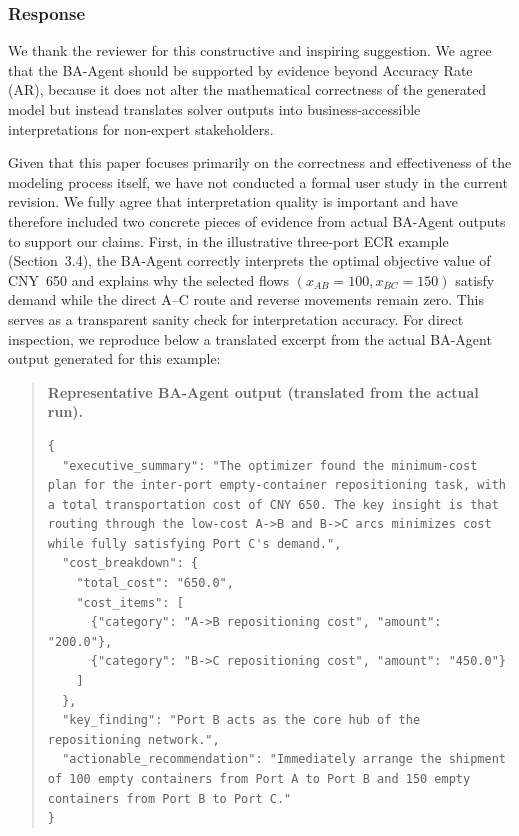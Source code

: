 \documentclass[11pt,a4paper]{article}
\begin{document}
\subsubsection{Response}
We thank the reviewer for this constructive and inspiring suggestion. We agree that the BA-Agent should be supported by evidence beyond Accuracy Rate (AR), because it does not alter the mathematical correctness of the generated model but instead translates solver outputs into business-accessible interpretations for non-expert stakeholders.

Given that this paper focuses primarily on the correctness and effectiveness of the modeling process itself, we have not conducted a formal user study in the current revision. We fully agree that interpretation quality is important and have therefore included two concrete pieces of evidence from actual BA-Agent outputs to support our claims. First, in the illustrative three-port ECR example (Section~3.4), the BA-Agent correctly interprets the optimal objective value of CNY~650 and explains why the selected flows $(x_{AB}{=}100, x_{BC}{=}150)$ satisfy demand while the direct A--C route and reverse movements remain zero. This serves as a transparent sanity check for interpretation accuracy. For direct inspection, we reproduce below a translated excerpt from the actual BA-Agent output generated for this example:

\begin{quote}
\textbf{Representative BA-Agent output (translated from the actual run).}
\begin{promptbox}
\begin{lstlisting}[style=prompttemplate]
{
  "executive_summary": "The optimizer found the minimum-cost plan for the inter-port empty-container repositioning task, with a total transportation cost of CNY 650. The key insight is that routing through the low-cost A->B and B->C arcs minimizes cost while fully satisfying Port C's demand.",
  "cost_breakdown": {
    "total_cost": "650.0",
    "cost_items": [
      {"category": "A->B repositioning cost", "amount": "200.0"},
      {"category": "B->C repositioning cost", "amount": "450.0"}
    ]
  },
  "key_finding": "Port B acts as the core hub of the repositioning network.",
  "actionable_recommendation": "Immediately arrange the shipment of 100 empty containers from Port A to Port B and 150 empty containers from Port B to Port C."
}
\end{lstlisting}
\end{promptbox}
\end{quote}
\end{document}
